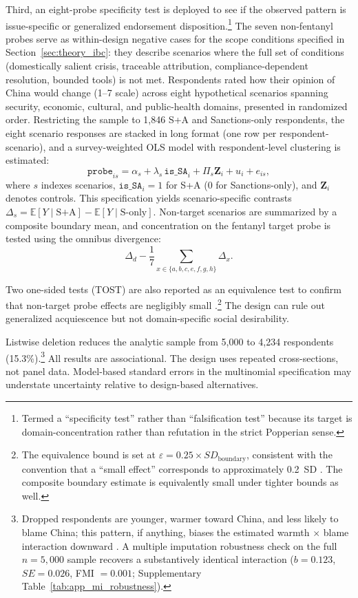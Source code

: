 \documentclass[12pt,letterpaper]{article}
\begin{document}
Third, an eight-probe specificity test is deployed to see if the observed pattern is issue-specific or generalized endorsement disposition.\footnote{Termed a ``specificity test'' rather than ``falsification test'' because its target is domain-concentration rather than refutation in the strict Popperian sense.} The seven non-fentanyl probes serve as within-design negative cases for the scope conditions specified in Section~\ref{sec:theory_ibc}: they describe scenarios where the full set of conditions (domestically salient crisis, traceable attribution, compliance-dependent resolution, bounded tools) is not met. Respondents rated how their opinion of China would change (1--7 scale) across eight hypothetical scenarios spanning security, economic, cultural, and public-health domains, presented in randomized order. Restricting the sample to 1,846 S+A and Sanctions-only respondents, the eight scenario responses are stacked in long format (one row per respondent-scenario), and a survey-weighted OLS model with respondent-level clustering is estimated:
\[
\texttt{probe}_{is}=\alpha_s+\lambda_s\,\texttt{is\_SA}_i+\Pi_s\mathbf{Z}_i+u_i+e_{is},
\]
where \(s\) indexes scenarios, \(\texttt{is\_SA}_i=1\) for S+A (0 for Sanctions-only), and \(\mathbf{Z}_i\) denotes controls. This specification yields scenario-specific contrasts \(\Delta_s=\mathbb{E}[Y\mid \text{S+A}]-\mathbb{E}[Y\mid \text{S-only}]\). Non-target scenarios are summarized by a composite boundary mean, and concentration on the fentanyl target probe is tested using the omnibus divergence:
\[
\Delta_d-\frac{1}{7}\sum_{x\in\{a,b,c,e,f,g,h\}}\Delta_x.
\]

Two one-sided tests (TOST) are also reported as an equivalence test to confirm that non-target probe effects are negligibly small \citep{lakens_equivalence_2017, lakens_equivalence_2018}.\footnote{The equivalence bound is set at \(\varepsilon=0.25\times SD_{\text{boundary}}\), consistent with the convention that a ``small effect'' corresponds to approximately 0.2~SD \citep{lakens_equivalence_2018}. The composite boundary estimate is equivalently small under tighter bounds as well.} The design can rule out generalized acquiescence but not domain-specific social desirability.

Listwise deletion reduces the analytic sample from 5,000 to 4,234 respondents (15.3\%).\footnote{Dropped respondents are younger, warmer toward China, and less likely to blame China; this pattern, if anything, biases the estimated warmth $\times$ blame interaction downward \citep{berinsky_silent_2002}. A multiple imputation robustness check on the full $n=5{,}000$ sample recovers a substantively identical interaction ($b=0.123$, $SE=0.026$, FMI $=0.001$; Supplementary Table~\ref{tab:app_mi_robustness}).} All results are associational. The design uses repeated cross-sections, not panel data. Model-based standard errors in the multinomial specification may understate uncertainty relative to design-based alternatives.
\end{document}
